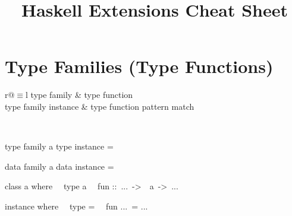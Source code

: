 \documentclass{refcard}
\title{Haskell Extensions Cheat Sheet}
\begin{document}
\maketitle

\section{Type Families (Type Functions)}

\begin{tabularlc}{r@{\s$\equiv$\s}l}
	type family          & type function \\	
	type family instance & type function pattern match \\
\end{tabularlc} \\[1em]
\begin{ldesc}
	\li[declaring]             type family  a
	\li[instantiating]         type instance   =  \li

	      data family  a
	  data instance   =  \li

	class  a where \li
	~~type  a \li
	~~fun ::~...~->~~a~->~... \li

	instance   where \li
	~~type    =   \li
	~~fun ...~= ... \li
\end{ldesc}
\end{document}
